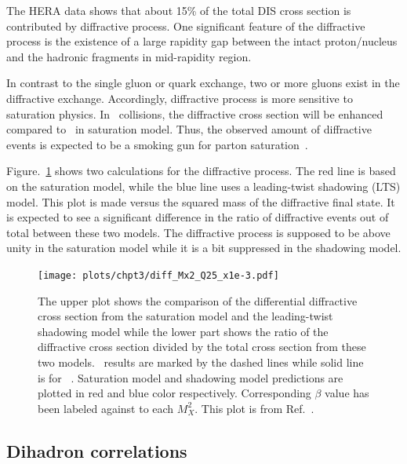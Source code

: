 The HERA data shows that about 15\% of the total DIS cross section is
contributed by diffractive process. One significant feature of the diffractive
process is the existence of a large rapidity gap between the intact
proton/nucleus and the hadronic fragments in mid-rapidity region.

In contrast to the single gluon or quark exchange, two or more gluons exist in
the diffractive exchange. Accordingly, diffractive process is more sensitive to
saturation physics. In \eA\ collisions, the diffractive cross section will be
enhanced compared to \ep\ in saturation model. Thus, the observed amount of
diffractive events is expected to be a smoking gun for parton
saturation~\cite{Kowalski:2008sa}.

Figure.~\ref{fig:diff_eA} shows two calculations for the diffractive process.
The red line is based on the saturation model, while the blue line uses a
leading-twist shadowing (LTS) model. This plot is made versus the squared mass
of the diffractive final state. It is expected to see a significant difference
in the ratio of diffractive events out of total between these two models. The
diffractive process is supposed to be above unity in the saturation model while it
is a bit suppressed in the shadowing model.
\begin{figure}
\centering
\texttt{[image: plots/chpt3/diff\_Mx2\_Q25\_x1e-3.pdf]}
\caption[Ratio of diffractive cross section out of the total cross section from saturation model and shadowing model]{
The upper plot shows the comparison of the differential diffractive cross section from the saturation model and the leading-twist shadowing model while the lower part shows the ratio of the diffractive cross section divided by the total cross section from these two models. 
\eAu\ results are marked by the dashed lines while solid line is for \ep\ . Saturation model and shadowing model predictions
are plotted in red and blue color respectively. Corresponding $\beta$ value has been labeled against to each $M_{X}^{2}$.
This plot is from Ref.~\cite{Aschenauer:2014a}.}
\label{fig:diff_eA}
\end{figure}

\subsection{Dihadron correlations}  \label{subsec:dihadron_preintro}

